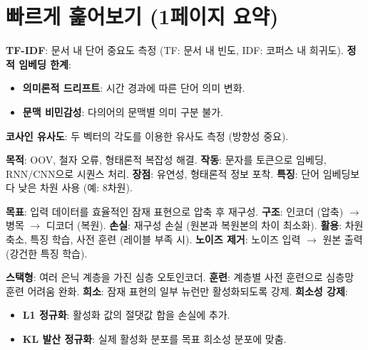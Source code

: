 \documentclass[11pt,a4paper]{article}
\begin{document}
\newpage
\section{빠르게 훑어보기 (1페이지 요약)}

\begin{tcolorbox}[colback=myblue!20, colframe=blue!75!black, title=\textbf{핵심 개념 요약}]
\textbf{TF-IDF}: 문서 내 단어 중요도 측정 (TF: 문서 내 빈도, IDF: 코퍼스 내 희귀도).
\textbf{정적 임베딩 한계}:
\begin{itemize}
    \item \textbf{의미론적 드리프트}: 시간 경과에 따른 단어 의미 변화.
    \item \textbf{문맥 비민감성}: 다의어의 문맥별 의미 구분 불가.
\end{itemize}
\textbf{코사인 유사도}: 두 벡터의 각도를 이용한 유사도 측정 (방향성 중요).
\end{tcolorbox}

\begin{tcolorbox}[colback=mygreen!20, colframe=green!75!black, title=\textbf{문자 임베딩}]
\textbf{목적}: OOV, 철자 오류, 형태론적 복잡성 해결.
\textbf{작동}: 문자를 토큰으로 임베딩, RNN/CNN으로 시퀀스 처리.
\textbf{장점}: 유연성, 형태론적 정보 포착.
\textbf{특징}: 단어 임베딩보다 낮은 차원 사용 (예: 8차원).
\end{tcolorbox}

\begin{tcolorbox}[colback=myyellow!20, colframe=orange!75!black, title=\textbf{오토인코더 (Autoencoders)}]
\textbf{목표}: 입력 데이터를 효율적인 잠재 표현으로 압축 후 재구성.
\textbf{구조}: 인코더 (압축) $\rightarrow$ 병목 $\rightarrow$ 디코더 (복원).
\textbf{손실}: 재구성 손실 (원본과 복원본의 차이 최소화).
\textbf{활용}: 차원 축소, 특징 학습, 사전 훈련 (레이블 부족 시).
\textbf{노이즈 제거}: 노이즈 입력 $\rightarrow$ 원본 출력 (강건한 특징 학습).
\end{tcolorbox}

\begin{tcolorbox}[colback=myred!20, colframe=red!75!black, title=\textbf{스택형 \& 희소 오토인코더}]
\textbf{스택형}: 여러 은닉 계층을 가진 심층 오토인코더.
\textbf{훈련}: 계층별 사전 훈련으로 심층망 훈련 어려움 완화.
\textbf{희소}: 잠재 표현의 일부 뉴런만 활성화되도록 강제.
\textbf{희소성 강제}:
\begin{itemize}
    \item \textbf{L1 정규화}: 활성화 값의 절댓값 합을 손실에 추가.
    \item \textbf{KL 발산 정규화}: 실제 활성화 분포를 목표 희소성 분포에 맞춤.
\end{itemize}
\end{tcolorbox}
\end{document}
